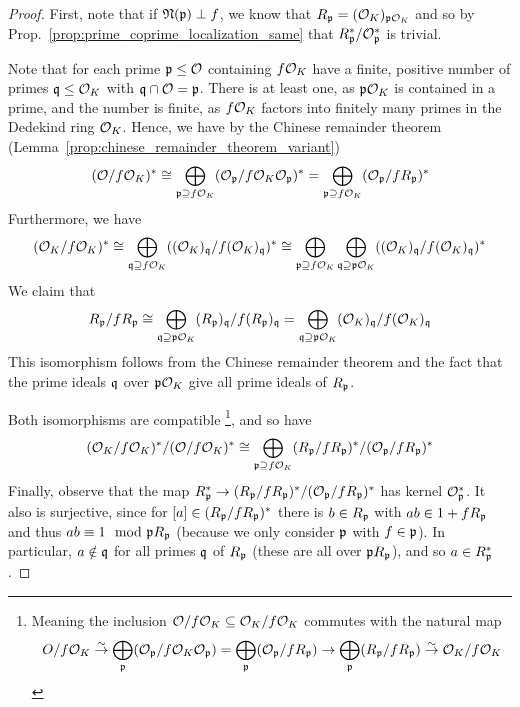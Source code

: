 \begin{proof}
    First, note that if $\Norm(\p) \perp f$, we know that $R_\p = (\O_K)_{\p\O_K}$ and so by Prop.~\ref{prop:prime_coprime_localization_same} that $R_\p^*/\O_\p^*$ is trivial.
    
    Note that for each prime $\p \leq \O$ containing $f\O_K$ have a finite, positive number of primes $\q \leq \O_K$ with $\q \cap \O = \p$.
    There is at least one, as $\p\O_K$ is contained in a prime, and the number is finite, as $f\O_K$ factors into finitely many primes in the Dedekind ring $\O_K$.
    Hence, we have by the Chinese remainder theorem (Lemma~\ref{prop:chinese_remainder_theorem_variant})
    \begin{equation*}
        (\O/f\O_K)^* \cong \bigoplus_{\p \supseteq f\O_K} (\O_\p/f\O_K\O_\p)^* = \bigoplus_{\p \supseteq f\O_K} (\O_\p/fR_\p)^*
    \end{equation*}
    Furthermore, we have
    \begin{equation*}
        (\O_K/f\O_K)^* \cong \bigoplus_{\q \supseteq f\O_K} ((\O_K)_\q/f(\O_K)_\q)^* \cong \bigoplus_{\p \supseteq f\O_K} \bigoplus_{\q \supseteq \p\O_K} ((\O_K)_\q/f(\O_K)_\q)^*
    \end{equation*}
    We claim that
    \begin{equation*}
        R_\p/fR_\p \cong \bigoplus_{\q \supseteq \p\O_K} (R_\p)_\q/f(R_\p)_\q = \bigoplus_{\q \supseteq \p\O_K} (\O_K)_\q/f(\O_K)_\q
    \end{equation*}
    This isomorphism follows from the Chinese remainder theorem and the fact that the prime ideals $\q$ over $\p\O_K$ give all prime ideals of $R_\p$.
    
    Both isomorphisms are compatible
    \footnote{Meaning the inclusion $\O/f\O_K \subseteq \O_K/f\O_K$ commutes with the natural map
    \begin{equation*}
        O/f\O_K \overset{\sim}{\to} \bigoplus_\p (\O_\p/f\O_K\O_\p) = \bigoplus_\p (\O_\p/fR_\p) \to \bigoplus_\p (R_\p/fR_\p) \overset{\sim}{\to} \O_K/f\O_K
    \end{equation*}
    }, 
    and so have
    \begin{equation*}
        (\O_K/f\O_K)^*/(\O/f\O_K)^* \cong \bigoplus_{\p \supseteq f\O_K} (R_\p/fR_\p)^*/(\O_\p/fR_\p)^*
    \end{equation*}
    Finally, observe that the map $R_\p^* \to (R_\p/fR_\p)^*/(\O_\p/fR_\p)^*$ has kernel $\O_\p^*$.
    It also is surjective, since for $[a] \in (R_\p/fR_\p)^*$ there is $b \in R_\p$ with $ab \in 1 + fR_\p$ and thus $ab \equiv 1 \mod \p R_\p$ (because we only consider $\p$ with $f \in \p$).
    In particular, $a \notin \q$ for all primes $\q$ of $R_\p$ (these are all over $\p R_\p$), and so $a \in R_\p^*$.
\end{proof}
